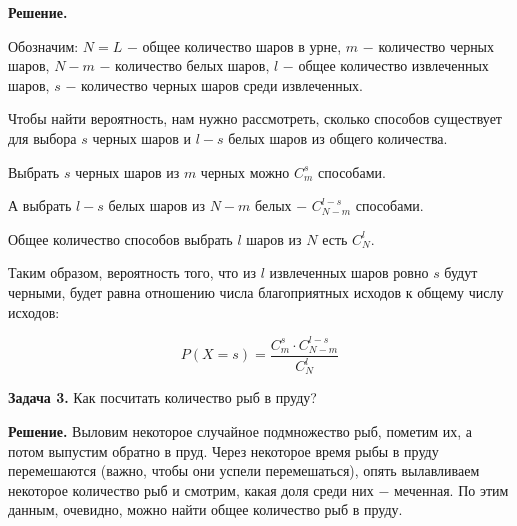 \textbf{Решение.}

Обозначим:
$N = L$ $-$ общее количество шаров в урне,
$m$ $-$ количество черных шаров,
$N - m$ $-$ количество белых шаров,
$l$ $-$ общее количество извлеченных шаров,
$s$ $-$ количество черных шаров среди извлеченных.

Чтобы найти вероятность, нам нужно рассмотреть, сколько способов существует для выбора $s$ черных шаров и $l - s$ белых шаров из общего количества.

Выбрать $s$ черных шаров из $m$ черных можно $C_m^s$ способами.

А выбрать $l - s$ белых шаров из $N - m$ белых $-$ $ C_{N - m}^{l - s}$ способами.

Общее количество способов выбрать $l$ шаров из $N$ есть $C_N^l$.

Таким образом, вероятность того, что из $l$ извлеченных шаров ровно $s$ будут черными, будет равна отношению числа благоприятных исходов к общему числу исходов:

$$
P(X = s) = \frac{C_{m}^{s} \cdot C_{N - m}^{l - s}}{C_{N}^{l}}
$$

\textbf{Задача 3.} Как посчитать количество рыб в пруду?

\textbf{Решение.} Выловим некоторое случайное подмножество рыб, пометим их, а потом выпустим обратно в пруд. Через некоторое время рыбы в пруду перемешаются (важно, чтобы они успели перемешаться), опять вылавливаем некоторое количество рыб и смотрим, какая доля среди них $-$ меченная. По этим данным, очевидно, можно найти общее количество рыб в пруду.
